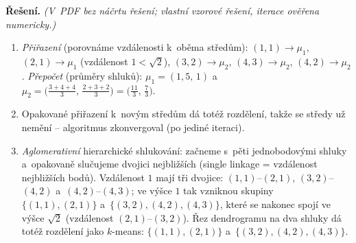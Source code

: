 \medskip
\noindent\textbf{Řešení.} \textit{(V~PDF bez náčrtu řešení; vlastní vzorové řešení, iterace ověřena numericky.)}\par
\begin{enumerate}[nosep]
  \item \emph{Přiřazení} (porovnáme vzdálenosti k~oběma středům): $(1,1)\to\mu_1$, $(2,1)\to\mu_1$ (vzdálenost $1<\sqrt2$), $(3,2)\to\mu_2$, $(4,3)\to\mu_2$, $(4,2)\to\mu_2$. \emph{Přepočet} (průměry shluků): $\mu_1=(1{,}5,\,1)$ a~$\mu_2=\big(\tfrac{3+4+4}{3},\,\tfrac{2+3+2}{3}\big)=\big(\tfrac{11}{3},\,\tfrac{7}{3}\big)$.
  \item Opakované přiřazení k~novým středům dá totéž rozdělení, takže se středy už nemění -- algoritmus zkonvergoval (po jediné iteraci).
  \item \emph{Aglomerativní} hierarchické shlukování: začneme s~pěti jednobodovými shluky a~opakovaně slučujeme dvojici nejbližších (single linkage = vzdálenost nejbližších bodů). Vzdálenost $1$ mají tři dvojice: $(1,1)$--$(2,1)$, $(3,2)$--$(4,2)$ a~$(4,2)$--$(4,3)$; ve výšce $1$ tak vzniknou skupiny $\{(1,1),(2,1)\}$ a~$\{(3,2),(4,2),(4,3)\}$, které se nakonec spojí ve výšce $\sqrt2$ (vzdálenost $(2,1)$--$(3,2)$). Řez dendrogramu na dva shluky dá totéž rozdělení jako $k$-means: $\{(1,1),(2,1)\}$ a~$\{(3,2),(4,2),(4,3)\}$.
\end{enumerate}
